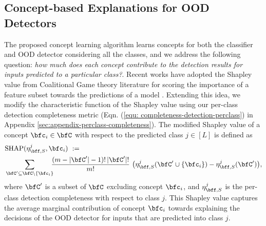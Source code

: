 \subsection{Concept-based Explanations for OOD Detectors}
\label{sec:expt_concept_based_explanations}
The proposed concept learning algorithm learns concepts for both the classifier and OOD detector considering all the classes, and
we address the following question: \textit{how much does each concept contribute to the detection results for inputs predicted to a particular class?}.
Recent works have adopted the Shapley value from Coalitional Game theory literature \citep{shapley1953value,fujimoto2006axiomatic} for scoring the importance of a feature subset towards the predictions of a model \citep{chen2018shapley,lundberg2017shapley,sundararajan2020shapley}.
Extending this idea, we modify the characteristic function of the Shapley value using our per-class detection completeness metric (Eqn. (\ref{equ: completeness-detection-perclass}) in Appendix \ref{sec:appendix-perclass-completeness}). 
The modified Shapley value of a concept $\bfc_i \in \bfC$ with respect to the predicted class $j \in [L]$ is defined as
\begin{align}
    \label{equ: ConceptSHAP}
    &\textrm{SHAP}(\eta^{j}_{\bff, S}, \bfc_i)  ~:=~ \nonumber \\
    &\sum_{\bfC' \subseteq \bfC \setminus \{\bfc_i\}} \!\!\!\frac{(m - |\bfC'| - 1)! \,|\bfC'|!}{m!} ~\big(\eta^{j}_{\bff, S}(\bfC' \cup \{\bfc_i\}) - \eta^{j}_{\bff, S}(\bfC')\big),
\end{align}
where $\bfC'$ is a subset of $\bfC$ excluding concept $\bfc_i$, and $\eta^{j}_{\bff, S}$ is the per-class detection completeness with respect to class $j$.
This Shapley value captures the average marginal contribution of concept $\bfc_i$ towards explaining the decisions of the OOD detector for inputs that are predicted into class $j$.


